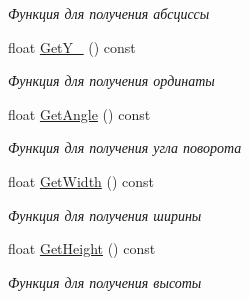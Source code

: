 \begin{DoxyCompactItemize}
\begin{DoxyCompactList}\small\item\em Функция для получения абсциссы \end{DoxyCompactList}\item 
float \hyperlink{classrtm_1_1_world_object_af558d23ff82794c8ace17b8aeefaf5bb}{Get\+Y\+\_\+} () const
\begin{DoxyCompactList}\small\item\em Функция для получения ординаты \end{DoxyCompactList}\item 
float \hyperlink{classrtm_1_1_world_object_ae9af0e03a3f49720b38ec69191c8d237}{Get\+Angle} () const
\begin{DoxyCompactList}\small\item\em Функция для получения угла поворота \end{DoxyCompactList}\item 
float \hyperlink{classrtm_1_1_world_object_a36a9cf3cce5c76f88164e0c790675a1e}{Get\+Width} () const
\begin{DoxyCompactList}\small\item\em Функция для получения ширины \end{DoxyCompactList}\item 
float \hyperlink{classrtm_1_1_world_object_ac1ab514e4556b3d8b9d4ffda5eba9db2}{Get\+Height} () const
\begin{DoxyCompactList}\small\item\em Функция для получения высоты \end{DoxyCompactList}\end{DoxyCompactItemize}
